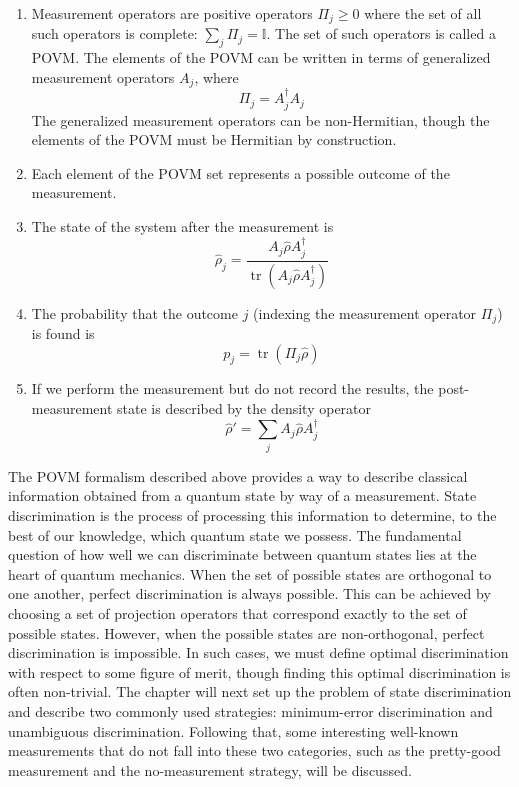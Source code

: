 \begin{enumerate}
    \item Measurement operators are positive operators $\Pi_j \geq 0$ where the set of all such operators is complete: $\sum_j \Pi_j = \mathbb{I}$. The set of such operators is called a POVM. The elements of the POVM can be written in terms of generalized measurement operators $A_j$, where 
    \begin{equation}
        \Pi_j = A_j^\dagger A_j
    \end{equation}
     The generalized measurement operators can be non-Hermitian, though the elements of the POVM must be Hermitian by construction.
    
    \item Each element of the POVM set represents a possible outcome of the measurement.
    
    \item The state of the system after the measurement is
    \begin{equation}
    \hat{\rho}_j = \frac{A_j \hat{\rho} A_j^\dagger}{\operatorname{tr}(A_j \hat{\rho} A_j^\dagger)}    
    \end{equation}

    
    \item The probability that the outcome $j$ (indexing the measurement operator $\Pi_j$) is found is 
    \begin{equation}
    p_j = \operatorname{tr}(\Pi_j \hat{\rho})    
    \end{equation}
    
    
    \item If we perform the measurement but do not record the results, the post-measurement state is described by the density operator 
    \begin{equation}
    \hat{\rho}' = \sum_j A_j \hat{\rho} A_j^\dagger    
    \end{equation}
    
\end{enumerate}

The POVM formalism described above provides a way to describe classical information obtained from a quantum state by way of a measurement. State discrimination is the process of processing this information to determine, to the best of our knowledge, which quantum state we possess. The fundamental question of how well we can discriminate between quantum states lies at the heart of quantum mechanics. When the set of possible states are orthogonal to one another, perfect discrimination is always possible. This can be achieved by choosing a set of projection operators that correspond exactly to the set of possible states. However, when the possible states are non-orthogonal, perfect discrimination is impossible. In such cases, we must define optimal discrimination with respect to some figure of merit, though finding this optimal discrimination is often non-trivial. The chapter will next set up the problem of state discrimination and describe two commonly used strategies: minimum-error discrimination and unambiguous discrimination. Following that, some interesting well-known measurements that do not fall into these two categories, such as the pretty-good measurement and the no-measurement strategy, will be discussed.

